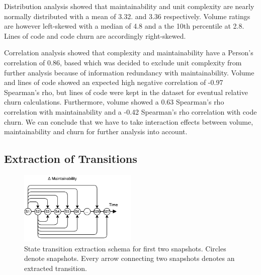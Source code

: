 Distribution analysis showed that maintainability and unit complexity are nearly normally distributed with a mean of 3.32. and 3.36 respectively. Volume ratings are however left-skewed with a median of 4.8 and a the 10th percentile at 2.8. Lines of code and code churn are accordingly right-skewed. 

Correlation analysis showed that complexity and maintainability have a Person's correlation of 0.86, based which was decided to exclude unit complexity from further analysis because of information redundancy with maintainability. Volume and lines of code showed an expected high negative correlation of -0.97 Spearman's rho, but lines of code were kept in the dataset for eventual relative churn calculations. Furthermore, volume showed a 0.63 Spearman's rho correlation with maintainability and a -0.42 Spearman's rho correlation with code churn. We can conclude that we have to take interaction effects between volume, maintainability and churn for further analysis into account.


\subsection{Extraction of Transitions}

\begin{figure}[htbp!]
  \label{schema}
  \centering
  \includegraphics[width=0.5\textwidth]{figs/extraction.pdf}
  \caption{State transition extraction schema for first two snapshots. Circles denote snapshots. Every arrow connecting two snapshots denotes an extracted transition.}
\end{figure}

